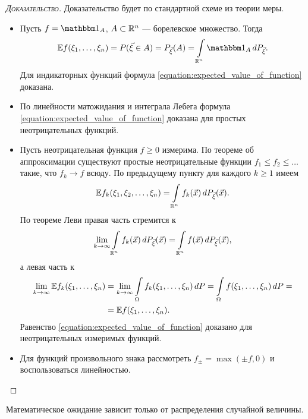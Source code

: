 \documentclass[../main.tex]{subfiles}
\begin{document}
\begin{proof}[\normalfont\textsc{Доказательство}]
 Доказательство будет по стандартной схеме из теории меры.
 \begin{itemize}
  \item Пусть $ f = \Ind_A $, $ A \subset \mathbb{R}^{n} $ --- борелевское множество. Тогда
   \begin{align*}
    \E f (\xi_1, \ldots, \xi_n) = P(\vec\xi \in A) = P_{\vec\xi}(A) = \int\limits_{\R^{n}} \Ind_A\,dP_{\vec\xi}.
   \end{align*}  Для индикаторных функций формула \eqref{equation:expected_value_of_function} доказана.
  \item По линейности матожидания и интеграла Лебега формула \eqref{equation:expected_value_of_function} доказана для простых неотрицательных функций.
  \item Пусть неотрицательная функция $ f \geqslant 0 $ измерима. По теореме об аппроксимации существуют простые неотрицательные функции $ f_1 \leqslant f_2 \leqslant \ldots $ такие, что $ f_k \to f $ всюду. По предыдущему пункту для каждого $ k \geqslant 1 $ имеем \begin{align*}
    \mathbb E f_k(\xi_1, \xi_2, \ldots, \xi_n) = \int\limits_{\mathbb{R}^{n}} f_k(\vec x) \,dP_{\vec\xi}(\vec x).
  \end{align*} По теореме Леви правая часть стремится к
   \begin{align*}
    \lim_{k \to \infty} \int\limits_{\mathbb{R}^{n}} f_k(\vec x)  \,dP_{\vec\xi}(\vec x) = \int\limits_{\mathbb{R}^{n}} f(\vec x)\,dP_{\vec\xi} (\vec x),
   \end{align*} а левая часть к
   \begin{align*}
    \lim_{k \to \infty} \mathbb E f_k (\xi_1, \ldots, \xi_n) &= \lim_{k \to \infty} \int\limits_{\Omega} f_k(\xi_1, \ldots, \xi_n) \,dP = \int\limits_{\Omega} f(\xi_1, \ldots, \xi_n)\,dP = \\
    &= \mathbb E f(\xi_1, \ldots, \xi_n).
   \end{align*} Равенство \eqref{equation:expected_value_of_function} доказано для неотрицательных измеримых функций.
  \item Для функций произвольного знака рассмотреть $ f_\pm = \max(\pm f, 0) $ и воспользоваться линейностью.
 \end{itemize}
\end{proof}
\begin{crly}
 Математическое ожидание зависит только от распределения случайной величины.
\end{crly}
\end{document}
